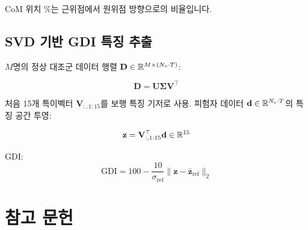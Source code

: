 \documentclass[11pt, a4paper]{report}
\begin{document}
CoM 위치 \%는 근위점에서 원위점 방향으로의 비율입니다.


\section{SVD 기반 GDI 특징 추출}
\label{sec:svd_gdi}

$M$명의 정상 대조군 데이터 행렬 $\mathbf{D} \in \mathbb{R}^{M \times (N_v \cdot T)}$:

\begin{equation}
\mathbf{D} = \mathbf{U} \bm{\Sigma} \mathbf{V}^\top
\end{equation}

처음 15개 특이벡터 $\mathbf{V}_{:,1:15}$를 보행 특징 기저로 사용. 피험자 데이터 $\mathbf{d} \in \mathbb{R}^{N_v \cdot T}$의 특징 공간 투영:

\begin{equation}
\mathbf{z} = \mathbf{V}_{:,1:15}^\top \mathbf{d} \in \mathbb{R}^{15}
\end{equation}

GDI:
\begin{equation}
\text{GDI} = 100 - \frac{10}{\sigma_{\text{ref}}} \| \mathbf{z} - \bar{\mathbf{z}}_{\text{ref}} \|_2
\end{equation}


\chapter*{참고 문헌}
\end{document}
